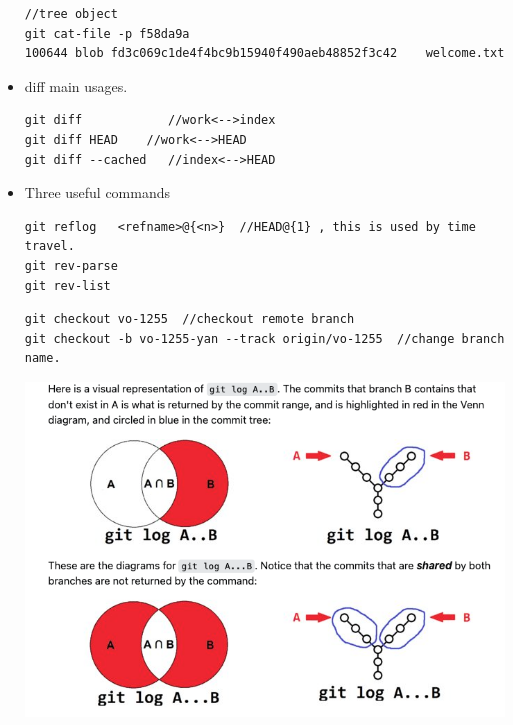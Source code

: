 \documentclass[a4paper,11pt,twoside]{book}
\begin{document}
\begin{itemize}
\begin{lstlisting}
//tree object
git cat-file -p f58da9a
100644 blob fd3c069c1de4f4bc9b15940f490aeb48852f3c42    welcome.txt
\end{lstlisting}

	\item diff main usages.
\begin{lstlisting}
git diff            //work<-->index
git diff HEAD    //work<-->HEAD
git diff --cached   //index<-->HEAD
\end{lstlisting}

	\item Three useful commands
\begin{lstlisting}
git reflog   <refname>@{<n>}  //HEAD@{1} , this is used by time travel. 
git rev-parse
git rev-list
\end{lstlisting}


\begin{lstlisting}
git checkout vo-1255  //checkout remote branch
git checkout -b vo-1255-yan --track origin/vo-1255  //change branch name. 
\end{lstlisting}
	
\begin{center}
	\includegraphics[scale=0.4]{pics/revision.png}
\end{center}
	

\end{itemize}
\end{document}
